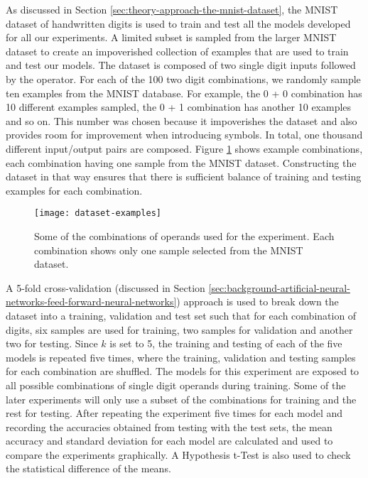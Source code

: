 As discussed in Section \ref{sec:theory-approach-the-mnist-dataset}, the MNIST dataset of handwritten digits is used to train and test all the models developed for all our experiments. A limited subset is sampled from the larger MNIST dataset to create an impoverished collection of examples that are used to train and test our models. The dataset is composed of two single digit inputs followed by the operator. For each of the 100 two digit combinations, we randomly sample ten examples from the MNIST database. For example, the 0 + 0 combination has 10 different examples sampled, the 0 + 1 combination has another 10 examples and so on. This number was chosen because it impoverishes the dataset and also provides room for improvement when introducing symbols. In total, one thousand different input/output pairs are composed. Figure \ref{fig:dataset-examples} shows example combinations, each combination having one sample from the MNIST dataset. Constructing the dataset in that way ensures that there is sufficient balance of training and testing examples for each combination.

\begin{figure}[t]
	\centering
	\texttt{[image: dataset-examples]}
	\caption{Some of the combinations of operands used for the experiment. Each combination shows only one sample selected from the MNIST dataset.}
	\label{fig:dataset-examples}
\end{figure}

A 5-fold cross-validation (discussed in Section \ref{sec:background-artificial-neural-networks-feed-forward-neural-networks}) approach is used to break down the dataset into a training, validation and test set such that for each combination of digits, six samples are used for training, two samples for validation and another two for testing. Since $k$ is set to 5, the training and testing of each of the five models is repeated five times, where the training, validation and testing samples for each combination are shuffled. The models for this experiment are exposed to all possible combinations of single digit operands during training. Some of the later experiments will only use a subset of the combinations for training and the rest for testing. After repeating the experiment five times for each model and recording the accuracies obtained from testing with the test sets, the mean accuracy and standard deviation for each model are calculated and used to compare the experiments graphically. A Hypothesis t-Test is also used to check the statistical difference of the means.

